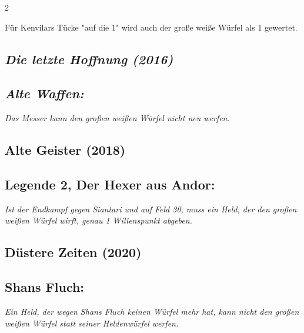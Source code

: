 \documentclass[10pt, a4paper, oneside]{book}
\newcommand{\fan}[1]{\textit{#1}}
\begin{document}
\begin{multicols*}{2}
\begin{bgcolor}
Für Kenvilars Tücke "auf die 1" wird auch der große weiße Würfel als 1 gewertet.
\supercite{15179}

\end{bgcolor}


\begin{bgcolor}
\section{\fan{Die letzte Hoffnung (2016)}}

\subsection{\fan{Alte Waffen:}}

\fan{Das Messer kann den großen weißen Würfel nicht neu werfen.}



\end{bgcolor}






\begin{bgcolor}[color-AG]
\section{Alte Geister (2018)}



\subsection{Legende 2, Der Hexer aus Andor:}

\fan{Ist der Endkampf gegen Siantari und auf Feld 30, muss ein Held, der den großen weißen Würfel wirft, genau 1 Willenspunkt abgeben.}



\end{bgcolor}


\begin{bgcolor}[color-DZ]
\section{Düstere Zeiten (2020)}



\subsection{Shans Fluch:}

\fan{Ein Held, der wegen Shans Fluch keinen Würfel mehr hat, kann nicht den großen weißen Würfel statt seiner Heldenwürfel werfen.}




\end{bgcolor}
\end{multicols*}
\end{document}
